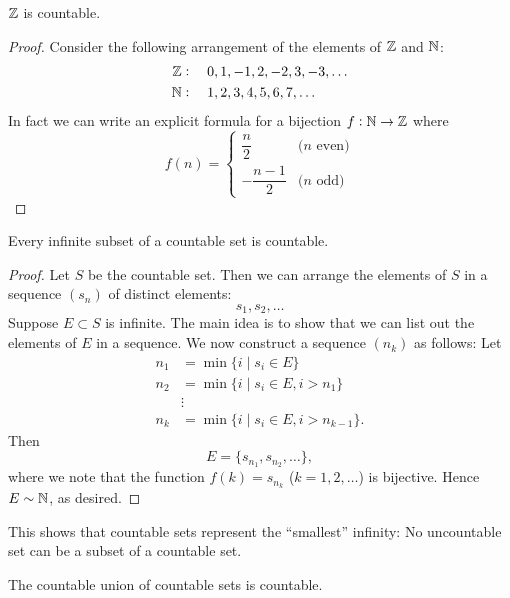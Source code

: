 \begin{example}
$\mathbb Z$ is countable.
\begin{proof}
Consider the following arrangement of the elements of $\mathbb Z$ and $\mathbb N$:
\begin{align*}
\mathbb Z&:\quad0,1,-1,2,-2,3,-3,\dots\\
\mathbb N&:\quad1,2,3,4,5,6,7,\dots
\end{align*}
In fact we can write an explicit formula for a bijection $f:\mathbb N\to\mathbb Z$ where
\[f(n)=\begin{cases}
\dfrac{n}{2}&\text{($n$ even)}\\[1ex]
-\dfrac{n-1}{2}&\text{($n$ odd)}
\end{cases}\]
\end{proof}
\end{example}

\begin{proposition}\label{prop:infinite-subset-countable}
Every infinite subset of a countable set is countable.
\end{proposition}

\begin{proof}
Let $S$ be the countable set. Then we can arrange the elements of $S$ in a sequence $(s_n)$ of distinct elements:
\[s_1,s_2,\dots\]
Suppose $E\subset S$ is infinite. The main idea is to show that we can list out the elements of $E$ in a sequence. We now construct a sequence $(n_k)$ as follows: Let
\begin{align*}
n_1&=\min\{i\mid s_i\in E\}\\
n_2&=\min\{i\mid s_i\in E,i>n_1\}\\
&\vdots\\
n_k&=\min\{i\mid s_i\in E,i>n_{k-1}\}.
\end{align*}
Then
\[E=\{s_{n_1},s_{n_2},\dots\},\]
where we note that the function $f(k)=s_{n_k}$ ($k=1,2,\dots$) is bijective. Hence $E\sim\mathbb N$, as desired.
\end{proof}

\begin{remark}
This shows that countable sets represent the ``smallest'' infinity: No uncountable set can be a subset of a countable set.
\end{remark}

\begin{proposition}\label{prop:union-countable}
The countable union of countable sets is countable.
\end{proposition}


